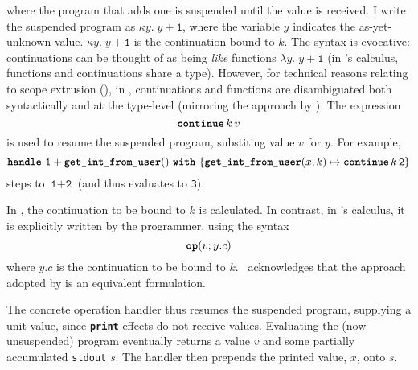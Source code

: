 \noindent where the program that adds one is suspended until the value is received. I write the suspended program as $\kappa y. \; y+\texttt{1}$, where the variable $y$ indicates the as-yet-unknown value. $\kappa y. \; y+\texttt{1}$ is the continuation bound to $k$. The syntax is evocative: continuations can be thought of as being \textit{like}  functions $\lambda y. \; y+\texttt{1}$ (in \citeauthor{pretnar-15}'s calculus, functions and continuations share a type). However, for technical reasons relating to scope extrusion (), in \efflang{}, continuations and functions are disambiguated both syntactically and at the type-level (mirroring the approach by \citet{isoda-24}). The expression 
\[\textbf{\texttt{continue}} \, {k} \, {v}\] 
is used to resume the suspended program, substiting value $v$ for $y$. For example,  
\[\textbf{\texttt{handle}} \,\, {\texttt{1} + \textbf{\texttt{get\_int\_from\_user}}()} \,\, \textbf{\texttt{with}} \,\, \{{\textbf{\texttt{get\_int\_from\_user}}(x, k) \mapsto \textbf{\texttt{continue}} \, {k} \, {\texttt{2}}}\}\]
steps to $\texttt{1} + \texttt{2}$ (and thus evaluates to \texttt{3}).

In \efflang{}, the continuation to be bound to $k$ is calculated. In contrast, in \citeauthor{pretnar-15}'s calculus, it is explicitly written by the programmer, using the syntax 
\[\textbf{\texttt{op}}({v; y.c})\]
where $y.c$ is the continuation to be bound to $k$.\ \citeauthor{pretnar-15} acknowledges that the approach adopted by \efflang{} is an equivalent formulation.

The concrete operation handler thus resumes the suspended program, supplying a unit value, since \textbf{\texttt{print}} effects do not receive values. Evaluating the (now unsuspended) program eventually returns a value $v$ and some partially accumulated \texttt{stdout} $s$. The handler then prepends the printed value, $x$, onto $s$. 



